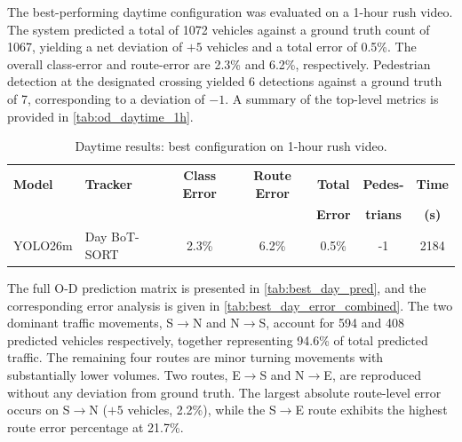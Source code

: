 The best-performing daytime configuration was evaluated on a 1-hour rush video. The system predicted a total of 1072 vehicles against a ground truth count of 1067, yielding a net deviation of $+5$ vehicles and a total error of 0.5\%. The overall class-error and route-error are 2.3\% and 6.2\%, respectively. Pedestrian detection at the designated crossing yielded 6 detections against a ground truth of 7, corresponding to a deviation of $-1$. A summary of the top-level metrics is provided in \autoref{tab:od_daytime_1h}.

\begin{table}[H]
\caption{Daytime results: best configuration on 1-hour rush video.}
\centering
\small
\begin{tabular}{l l c c c c c}
\toprule
\textbf{Model} & \textbf{Tracker} & \textbf{Class Error} & \textbf{Route Error} & \textbf{Total} & \textbf{Pedes-} & \textbf{Time} \\
& & & & \textbf{Error} & \textbf{trians} & \textbf{(s)} \\
\midrule
YOLO26m & Day BoT-SORT & 2.3\% & 6.2\% & 0.5\% & -1 & 2184 \\
\bottomrule
\end{tabular}
\label{tab:od_daytime_1h}
\end{table}

The full O-D prediction matrix is presented in \autoref{tab:best_day_pred},
and the corresponding error analysis is given in \autoref{tab:best_day_error_combined}. The
two dominant traffic movements, S$\to$N and N$\to$S, account for 594 and 408 predicted
vehicles respectively, together representing 94.6\% of total predicted traffic. The
remaining four routes are minor turning movements with substantially lower volumes. Two
routes, E$\to$S and N$\to$E, are reproduced without any deviation from ground truth. The
largest absolute route-level error occurs on S$\to$N ($+5$ vehicles, 2.2\%), while the
S$\to$E route exhibits the highest route error percentage at 21.7\%.

